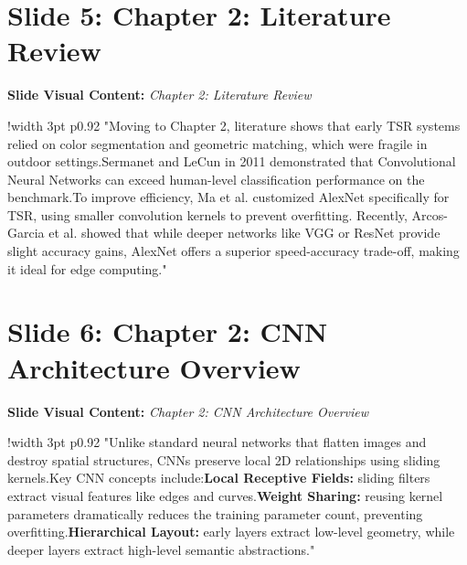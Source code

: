 \documentclass[11pt]{article}
\begin{document}
\section{Slide 5: Chapter 2: Literature Review}
\textbf{Slide Visual Content:} \textit{Chapter 2: Literature Review}\\ [8pt]
\noindent
\begin{tabular}{!{\color{primary}\vrule width 3pt} p{0.92\textwidth}}
  \small\color{black!80} "Moving to Chapter 2, literature shows that early TSR systems relied on color segmentation and geometric matching, which were fragile in outdoor settings.\newline\newline Sermanet and LeCun in 2011 demonstrated that Convolutional Neural Networks can exceed human-level classification performance on the benchmark.\newline\newline To improve efficiency, Ma et al. customized AlexNet specifically for TSR, using smaller convolution kernels to prevent overfitting. Recently, Arcos-Garcia et al. showed that while deeper networks like VGG or ResNet provide slight accuracy gains, AlexNet offers a superior speed-accuracy trade-off, making it ideal for edge computing."
\end{tabular}
\vspace{15pt}

\section{Slide 6: Chapter 2: CNN Architecture Overview}
\textbf{Slide Visual Content:} \textit{Chapter 2: CNN Architecture Overview}\\ [8pt]
\noindent
\begin{tabular}{!{\color{primary}\vrule width 3pt} p{0.92\textwidth}}
  \small\color{black!80} "Unlike standard neural networks that flatten images and destroy spatial structures, CNNs preserve local 2D relationships using sliding kernels.\newline\newline Key CNN concepts include:\newline\newline *   \textbf{Local Receptive Fields:} sliding filters extract visual features like edges and curves.\newline\newline *   \textbf{Weight Sharing:} reusing kernel parameters dramatically reduces the training parameter count, preventing overfitting.\newline\newline *   \textbf{Hierarchical Layout:} early layers extract low-level geometry, while deeper layers extract high-level semantic abstractions."
\end{tabular}
\vspace{15pt}
\end{document}
